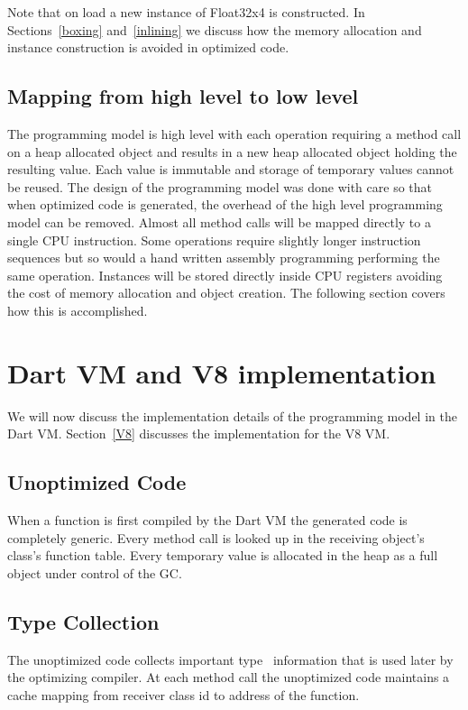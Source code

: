 \documentclass[preprint]{sigplanconf}
\begin{document}
Note that on load a new instance of Float32x4 is constructed. In
Sections~\ref{boxing} and~\ref{inlining} we discuss how the memory allocation
and instance construction is avoided in optimized code.

\subsection{Mapping from high level to low level}

The programming model is high level with each operation requiring a method call
on a heap allocated object and results in a new heap allocated object holding
the resulting value. Each value is immutable and storage of temporary values
cannot be reused. The design of the programming model was done with care so that
when optimized code is generated, the overhead of the high level programming
model can be removed. Almost all method calls will be mapped directly to a
single CPU instruction. Some operations require slightly longer instruction
sequences but so would a hand written assembly programming performing the same
operation. Instances will be stored directly inside CPU registers avoiding the
cost of memory allocation and object creation. The following section covers how
this is accomplished.

\section{Dart VM and V8 implementation}

We will now discuss the implementation details of the programming model in the
Dart VM. Section~\ref{V8} discusses the implementation for the V8 VM.

\subsection{Unoptimized Code}

When a function is first compiled by the Dart VM the generated code is
completely generic. Every method call is looked up in the receiving object's
class's function table. Every temporary value is allocated in the heap as a full
object under control of the GC.

\subsection{Type Collection}

The unoptimized code collects important type~\cite{typefeedback} information
that is used later by the optimizing compiler. At each method call the
unoptimized code maintains a cache mapping from receiver class id to address of
the function.
\end{document}
